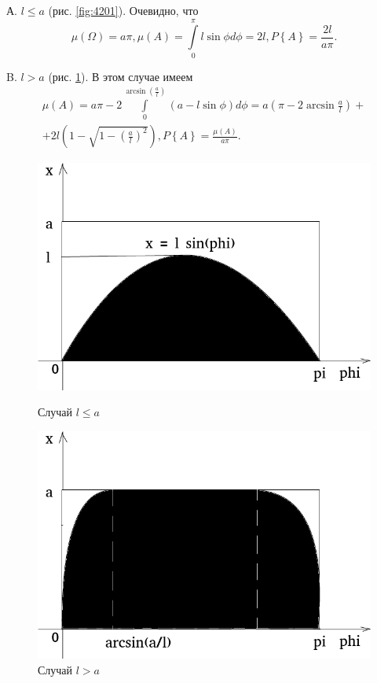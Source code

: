 А. $l \leq a$ (рис. \ref{fig:4201}).
Очевидно, что
$$ \mu \left( \Omega \right) =
a \pi,
\mu \left( A \right) =
\int \limits_{0}^{ \pi } l \sin \phi d \phi =
2l,
P \left\{ A \right\} =
\frac{2l}{a \pi}.$$

B. $l > a$ (рис. \ref{fig:4202}).
В этом случае имеем
\begin{equation*}
\begin{split}
\mu \left( A \right) =
a \pi - 2 \int \limits_{0}^{\arcsin \left( \frac{a}{l} \right) } \left( a - l \sin \phi \right) d \phi =
a \left( \pi - 2 \arcsin \frac{a}{l} \right) + \\
+ 2l \left( 1 - \sqrt{1 - \left( \frac{a}{l} \right)^2} \right),
P \left\{ A \right\} =
\frac{ \mu \left( A \right) }{a \pi}.
\end{split}
\end{equation*}

\begin{figure}[h!]
  \centering
  \begin{minipage}[b]{0.4\textwidth}
    \includegraphics[width=\textwidth]{./pictures/4_201.png}
    \caption{Случай $l \leq a$}
    \label{fig:4201}
  \end{minipage}
  \hfill
  \begin{minipage}[b]{0.4\textwidth}
    \includegraphics[width=\textwidth]{./pictures/4_202.png}
    \caption{Случай $l > a$}
    \label{fig:4202}
  \end{minipage}
\end{figure}

